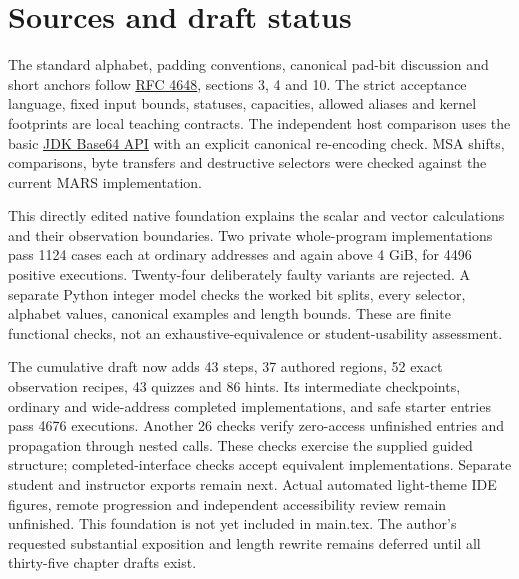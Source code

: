 \section{Sources and draft status}
The standard alphabet, padding conventions, canonical pad-bit discussion and short
anchors follow \href{https://www.rfc-editor.org/rfc/rfc4648.html}{RFC 4648}, sections
3, 4 and 10. The strict acceptance language, fixed input bounds, statuses, capacities,
allowed aliases and kernel footprints are local teaching contracts. The independent
host comparison uses the basic \href{https://docs.oracle.com/en/java/javase/25/docs/api/java.base/java/util/Base64.html}{JDK Base64 API}
with an explicit canonical re-encoding check. MSA shifts, comparisons, byte transfers
and destructive selectors were checked against the current MARS implementation.

This directly edited native foundation explains the scalar and vector calculations and
their observation boundaries. Two private whole-program implementations pass 1124 cases
each at ordinary addresses and again above 4 GiB, for 4496 positive executions.
Twenty-four deliberately faulty variants are rejected. A separate Python integer model
checks the worked bit splits, every selector, alphabet values, canonical examples and
length bounds. These are finite functional checks, not an exhaustive-equivalence or
student-usability assessment.

The cumulative draft now adds 43 steps, 37 authored regions, 52 exact observation
recipes, 43 quizzes and 86 hints. Its intermediate checkpoints, ordinary and wide-address
completed implementations, and safe starter entries pass 4676 executions. Another
26 checks verify zero-access unfinished entries and propagation through nested calls.
These checks exercise the supplied guided structure; completed-interface checks accept
equivalent implementations. Separate student and instructor exports remain next. Actual automated light-theme IDE figures, remote
progression and independent accessibility review remain unfinished. This foundation is
not yet included in main.tex. The author's requested substantial exposition and length
rewrite remains deferred until all thirty-five chapter drafts exist.
